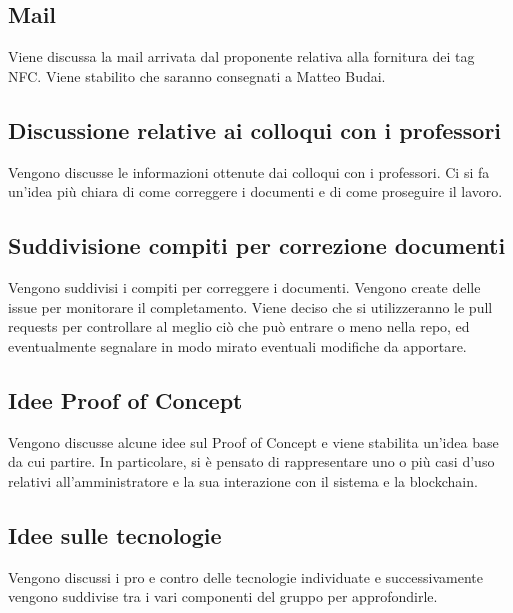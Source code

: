 \subsection*{Mail}
Viene discussa la mail arrivata dal proponente relativa alla fornitura dei tag NFC. Viene stabilito che saranno consegnati a Matteo Budai.
\subsection*{Discussione relative ai colloqui con i professori}
Vengono discusse le informazioni ottenute dai colloqui con i professori. Ci si fa un'idea più chiara di come correggere i documenti e di come proseguire il lavoro.
\subsection*{Suddivisione compiti per correzione documenti}
Vengono suddivisi i compiti per correggere i documenti. Vengono create delle issue per monitorare il completamento. Viene deciso che si utilizzeranno le pull requests per controllare al meglio ciò che può entrare o meno nella repo, ed eventualmente segnalare in modo mirato eventuali modifiche da apportare.
\subsection*{Idee Proof of Concept}
Vengono discusse alcune idee sul Proof of Concept e viene stabilita un'idea base da cui partire.
In particolare, si è pensato di rappresentare uno o più casi d'uso relativi all'amministratore e la sua interazione con il sistema e la blockchain.
\subsection*{Idee sulle tecnologie}
Vengono discussi i pro e contro delle tecnologie individuate e successivamente vengono suddivise tra i vari componenti del gruppo per approfondirle.
